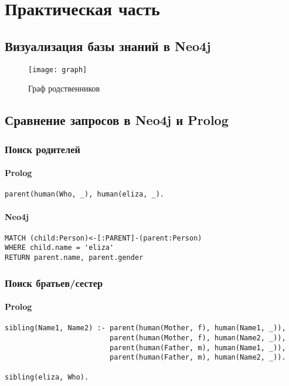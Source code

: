 \setcounter{page}{3}

\chapter{Практическая часть}
\section{Визуализация базы знаний в Neo4j}

\begin{figure}[h!]
\centering
    \texttt{[image: graph]}
    \caption{Граф родственников}
    \label{img:parents}	
\end{figure}

\section{Сравнение запросов в Neo4j и Prolog}

\subsection{Поиск родителей}

\subsubsection{Prolog}
\begin{lstlisting}[label=div,caption=Запрос]
parent(human(Who, _), human(eliza, _).
\end{lstlisting}

\subsubsection{Neo4j}
\begin{lstlisting}[label=div,caption=Запрос]
MATCH (child:Person)<-[:PARENT]-(parent:Person)
WHERE child.name = 'eliza'
RETURN parent.name, parent.gender
\end{lstlisting}


\subsection{Поиск братьев/сестер}

\subsubsection{Prolog}
\begin{lstlisting}[label=div,caption=Запрос]
sibling(Name1, Name2) :- parent(human(Mother, f), human(Name1, _)), 
	                     parent(human(Mother, f), human(Name2, _)),
	                     parent(human(Father, m), human(Name1, _)), 
	                     parent(human(Father, m), human(Name2, _)).

sibling(eliza, Who).
\end{lstlisting}

